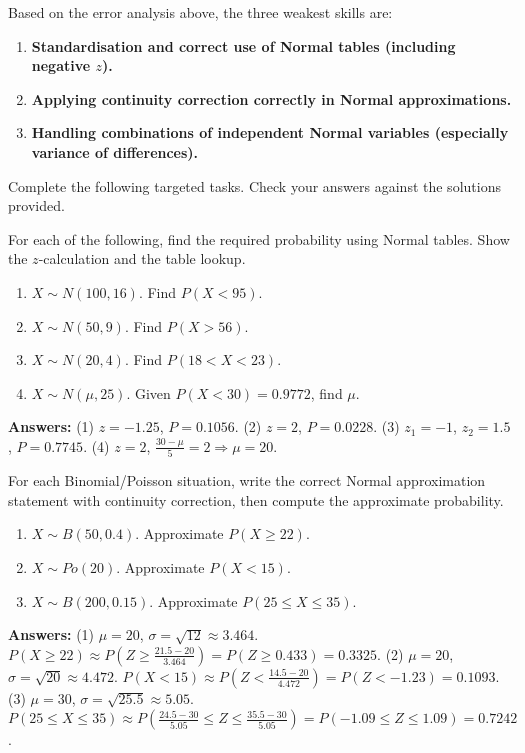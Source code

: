 \documentclass[11pt]{article}
\newcounter{popsec}
\newcounter{popsub}
\newcommand{\courssub}[1]{%
  \stepcounter{popsub}%
  \par\vspace{9pt}\noindent{\popxbold\fontsize{11.5}{13}\selectfont\color{popink}{\color{poporange}\thepopsec.\thepopsub}\hspace{6pt}#1}\par\nopagebreak\vspace{4pt}
}
\begin{document}
\courssub{Remediation Tasks}

Based on the error analysis above, the three weakest skills are:
\begin{enumerate}
\item \textbf{Standardisation and correct use of Normal tables (including negative $z$).}
\item \textbf{Applying continuity correction correctly in Normal approximations.}
\item \textbf{Handling combinations of independent Normal variables (especially variance of differences).}
\end{enumerate}

Complete the following targeted tasks. Check your answers against the solutions provided.

\begin{methode}
For each of the following, find the required probability using Normal tables. Show the $z$-calculation and the table lookup.
\begin{enumerate}
\item $X\sim N(100, 16)$. Find $P(X<95)$.
\item $X\sim N(50, 9)$. Find $P(X>56)$.
\item $X\sim N(20, 4)$. Find $P(18<X<23)$.
\item $X\sim N(\mu, 25)$. Given $P(X<30)=0.9772$, find $\mu$.
\end{enumerate}
\textbf{Answers:} (1) $z=-1.25$, $P=0.1056$. (2) $z=2$, $P=0.0228$. (3) $z_1=-1$, $z_2=1.5$, $P=0.7745$. (4) $z=2$, $\frac{30-\mu}{5}=2\Rightarrow\mu=20$.
\end{methode}

\begin{methode}
For each Binomial/Poisson situation, write the correct Normal approximation statement with continuity correction, then compute the approximate probability.
\begin{enumerate}
\item $X\sim B(50, 0.4)$. Approximate $P(X\ge 22)$.
\item $X\sim Po(20)$. Approximate $P(X<15)$.
\item $X\sim B(200, 0.15)$. Approximate $P(25\le X\le 35)$.
\end{enumerate}
\textbf{Answers:} (1) $\mu=20$, $\sigma=\sqrt{12}\approx 3.464$. $P(X\ge 22)\approx P(Z\ge\frac{21.5-20}{3.464})=P(Z\ge 0.433)=0.3325$. (2) $\mu=20$, $\sigma=\sqrt{20}\approx 4.472$. $P(X<15)\approx P(Z<\frac{14.5-20}{4.472})=P(Z<-1.23)=0.1093$. (3) $\mu=30$, $\sigma=\sqrt{25.5}\approx 5.05$. $P(25\le X\le 35)\approx P(\frac{24.5-30}{5.05}\le Z\le\frac{35.5-30}{5.05})=P(-1.09\le Z\le 1.09)=0.7242$.
\end{methode}
\end{document}
